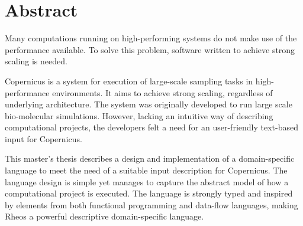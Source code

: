 \begingroup
\let\clearpage\relax
\let\cleardoublepage\relax
\let\cleardoublepage\relax

\chapter*{Abstract}

Many computations running on high-performing systems do not make use
of the performance available. To solve this problem, software written
to achieve strong scaling is needed.

Copernicus is a system for execution of large-scale sampling tasks in
high-performance environments. It aims to achieve strong scaling,
regardless of underlying architecture. The system was originally
developed to run large scale bio-molecular simulations. However,
lacking an intuitive way of describing computational projects, the
developers felt a need for an user-friendly text-based input for
Copernicus.

This master's thesis describes a design and implementation of a
domain-specific language to meet the need of a suitable input
description for Copernicus. The language design is simple yet manages
to capture the abstract model of how a computational project is
executed. The language is strongly typed and inspired by elements from
both functional programming and data-flow languages, making Rheos a
powerful descriptive domain-specific language.


\endgroup			

\vfill

